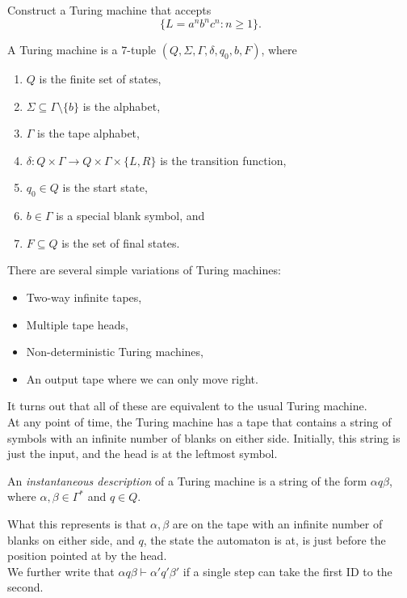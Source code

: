 	\begin{exercise}
		Construct a Turing machine that accepts
		\[ \{ L = a^nb^nc^n : n \ge 1 \}. \]
	\end{exercise}

	\begin{fdef}
		A Turing machine is a $7$-tuple $(Q,\Sigma,\Gamma,\delta,q_0,b,F)$, where
		\begin{enumerate}
			\item $Q$ is the finite set of states,
			\item $\Sigma \subseteq \Gamma \setminus \{b\}$ is the alphabet,
			\item $\Gamma$ is the tape alphabet,
			\item $\delta : Q \times \Gamma \to Q \times \Gamma \times \{L,R\}$ is the transition function,
			\item $q_0 \in Q$ is the start state,
			\item $b \in \Gamma$ is a special blank symbol, and
			\item $F \subseteq Q$ is the set of final states.
		\end{enumerate}
	\end{fdef}

	There are several simple variations of Turing machines:
	\begin{itemize}
		\item Two-way infinite tapes,
		\item Multiple tape heads,
		\item Non-deterministic Turing machines,
		\item An output tape where we can only move right.
	\end{itemize}
	It turns out that all of these are equivalent to the usual Turing machine.\\

	At any point of time, the Turing machine has a tape that contains a string of symbols with an infinite number of blanks on either side. Initially, this string is just the input, and the head is at the leftmost symbol.

	\begin{definition}
		An \emph{instantaneous description} of a Turing machine is a string of the form $\alpha q\beta$, where $\alpha,\beta \in \Gamma^*$ and $q \in Q$.
	\end{definition}
	What this represents is that $\alpha,\beta$ are on the tape with an infinite number of blanks on either side, and $q$, the state the automaton is at, is just before the position pointed at by the head.\\
	We further write that $\alpha q \beta \vdash \alpha' q' \beta'$ if a single step can take the first ID to the second.


